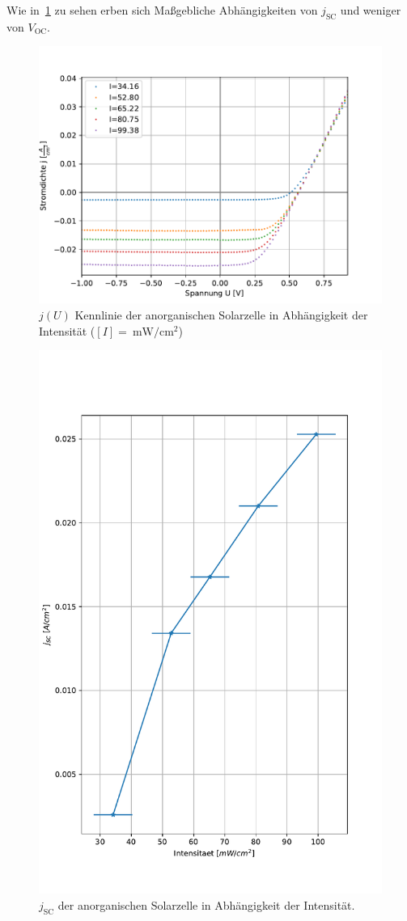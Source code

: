\documentclass[slug=SZ, room=Hermann-Krone-Bau\,\ Labor\ 1.25, supervisor=Martin\ Kroll]{../../Lab_Report_LaTeX/lab_report}
\newcommand{\mwcm}[1]{\SI{#1}{\milli\watt\per\centi\meter^2}}
\newcommand{\voc}{V_{\text{OC}}}
\newcommand{\jsc}{j_{\text{SC}}}
\begin{document}
Wie in~\ref{fig:b-all} zu sehen erben sich Ma\ss{}gebliche
Abh\"angigkeiten von \(\jsc\) und weniger von \(\voc\).
\begin{figure}[H]\centering
  \includegraphics[width=.7\columnwidth]{./figs/python/B/all.pdf}
  \caption{\(j(U)\) Kennlinie der anorganischen Solarzelle in
    Abhängigkeit der Intensität (\([I] = \mwcm{}\))  }
  \label{fig:b-all}
\end{figure}
\begin{figure}[H]\centering
  \includegraphics[width=.7\columnwidth]{./figs/python/B/j_sc.pdf}
  \caption{\(\jsc\)  der anorganischen Solarzelle in
    Abhängigkeit der Intensität.}
  \label{fig:b-jsc}
\end{figure}
\end{document}
